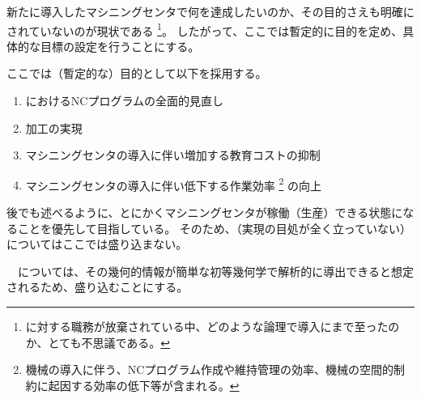 

新たに導入したマシニングセンタで何を達成したいのか、その目的さえも明確にされていないのが現状である
\footnote{\MMC に対する職務が放棄されている中、どのような論理で導入にまで至ったのか、とても不思議である。}。
したがって、ここでは暫定的に目的を定め、具体的な目標の設定を行うことにする。



ここでは（暫定的な）目的として以下を採用する。
\begin{enumerate}[label=\sarrow]
\item \MMC におけるNCプログラムの全面的見直し
\item \Dimple 加工の実現
\item マシニングセンタの導入に伴い増加する教育コストの抑制
\item マシニングセンタの導入に伴い低下する作業効率%
\footnote{機械の導入に伴う、NCプログラム作成や維持管理の効率、機械の空間的制約に起因する効率の低下等が含まれる。}
の向上
\end{enumerate}
\begin{hosoku}
後でも述べるように、とにかくマシニングセンタが稼働（生産）できる状態になることを優先して目指している。
そのため、（実現の目処が全く立っていない）\ReliefGrooveMilling についてはここでは盛り込まない。

　\Dimple については、その幾何的情報が簡単な初等幾何学で解析的に導出できると想定されるため、盛り込むことにする。
\end{hosoku}


\clearpage



